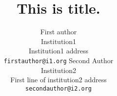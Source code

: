 \title{This is title.}

\author{First author\\
Institution1\\
Institution1 address\\
{\tt\small firstauthor@i1.org}
Second Author\\
Institution2\\
First line of institution2 address\\
{\tt\small secondauthor@i2.org}
}